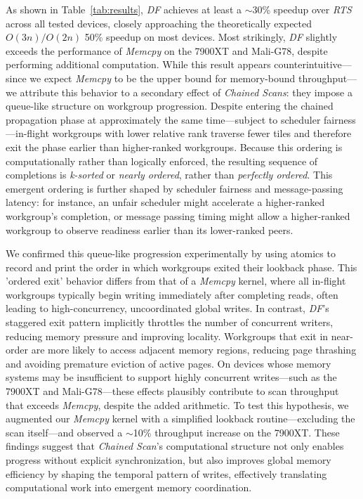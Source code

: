 \documentclass[sigconf,screen]{acmart}
\begin{document}
As shown in Table~\ref{tab:results}, \emph{DF} achieves at least a $\sim$30\% speedup over \emph{RTS} across all tested devices, closely approaching the theoretically expected $O(3n)/O(2n)$ 50\% speedup on most devices. Most strikingly, \emph{DF} slightly exceeds the performance of \emph{Memcpy} on the 7900XT and Mali-G78, despite performing additional computation. While this result appears counterintuitive—since we expect \emph{Memcpy} to be the upper bound for memory-bound throughput—we attribute this behavior to a secondary effect of \emph{Chained Scans}: they impose a queue-like structure on workgroup progression. Despite entering the chained propagation phase at approximately the same time—subject to scheduler fairness—in-flight workgroups with lower relative rank traverse fewer tiles and therefore exit the phase earlier than higher-ranked workgroups. Because this ordering is computationally rather than logically enforced, the resulting sequence of completions is \emph{k-sorted} or \emph{nearly ordered}, rather than \emph{perfectly ordered}. This emergent ordering is further shaped by scheduler fairness and message-passing latency: for instance, an unfair scheduler might accelerate a higher-ranked workgroup’s completion, or message passing timing might allow a higher-ranked workgroup to observe readiness earlier than its lower-ranked peers.

We confirmed this queue-like progression experimentally by using atomics to record and print the order in which workgroups exited their lookback phase. This 'ordered exit' behavior differs from that of a \emph{Memcpy} kernel, where all in-flight workgroups typically begin writing immediately after completing reads, often leading to high-concurrency, uncoordinated global writes. In contrast, \emph{DF}'s staggered exit pattern implicitly throttles the number of concurrent writers, reducing memory pressure and improving locality. Workgroups that exit in near-order are more likely to access adjacent memory regions, reducing page thrashing and avoiding premature eviction of active pages. On devices whose memory systems may be insufficient to support highly concurrent writes---such as the 7900XT and Mali-G78---these effects plausibly contribute to scan throughput that exceeds \emph{Memcpy}, despite the added arithmetic. To test this hypothesis, we augmented our \emph{Memcpy} kernel with a simplified lookback routine---excluding the scan itself---and observed a $\sim$10\% throughput increase on the 7900XT. These findings suggest that \emph{Chained Scan}'s computational structure not only enables progress without explicit synchronization, but also improves global memory efficiency by shaping the temporal pattern of writes, effectively translating computational work into emergent memory coordination.
\end{document}
